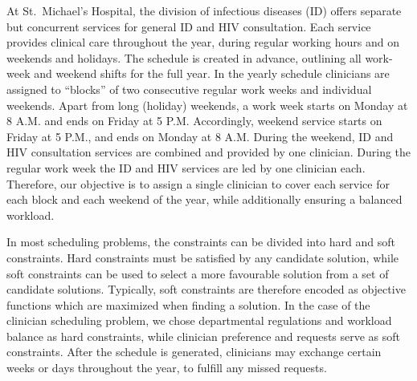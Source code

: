 At St.\ Michael's Hospital, the division of infectious diseases (ID) offers
separate but concurrent services for general ID and HIV consultation. Each
service provides clinical care throughout the year, during regular working hours
and on weekends and holidays. The schedule is created in advance,
outlining all work-week and weekend shifts for the full year.
In the yearly schedule clinicians are assigned to ``blocks'' of
two consecutive regular work weeks and individual weekends. Apart
from long (holiday) weekends, a work week starts on Monday at 8 A.M. and ends on
Friday at 5 P.M. Accordingly, weekend service starts on Friday at 5 P.M., and
ends on Monday at 8 A.M. During the weekend, ID and HIV consultation services
are combined and provided by one clinician. During the regular work week the ID
and HIV services are led by one clinician each.
Therefore, our objective is to assign a single clinician to cover
each service for each block and each weekend of the year, while 
additionally ensuring a balanced workload.

In most scheduling problems, the constraints can be divided into hard and soft
constraints. Hard constraints must be satisfied by any candidate solution, while
soft constraints can be used to select a more favourable solution from a set of
candidate solutions. Typically, soft constraints are therefore encoded as objective
functions which are
maximized when finding a solution. In the case of the clinician
scheduling problem, we chose departmental regulations and workload balance as hard constraints,
while clinician preference and requests serve as soft constraints.
After the schedule is generated, clinicians may
exchange certain weeks or days throughout the year, to fulfill any missed requests.

